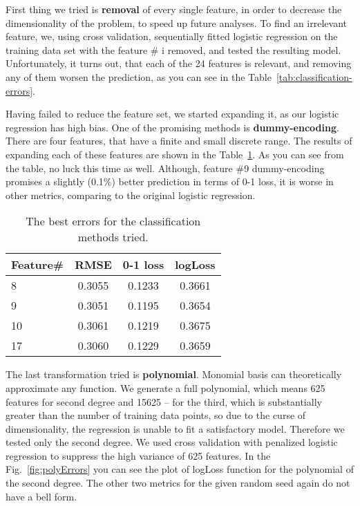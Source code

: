 \documentclass{article} %
\begin{document}
First thing we tried is {\bf removal} of every single feature, in order to decrease the dimensionality of the problem, to speed up future analyses. To find an irrelevant feature, we, using cross validation, sequentially fitted logistic regression on the training data set with the feature \# i removed, and tested the resulting model. Unfortunately, it turns out, that each of the 24 features is relevant, and removing any of them worsen the prediction, as you can see in the Table~\ref{tab:classification-errors}.

Having failed to reduce the feature set, we started expanding it, as our logistic regression has high bias. One of the promising methods is {\bf dummy-encoding}. There are four features, that have a finite and small discrete range. The results of expanding each of these features are shown in the Table~\ref{tab:classification-dummy}. As you can see from the table, no luck this time as well. Although, feature \#9 dummy-encoding promises a slightly (0.1\%) better prediction in terms of 0-1 loss, it is worse in other metrics, comparing to the original logistic regression.
\begin{table}[h]
  \begin{center}
    \begin{tabular}{l|ccc}
      Feature\# & RMSE & 0-1 loss & logLoss \\
      \hline
      8 & 0.3055 & 0.1233 & 0.3661 \\
      9 & 0.3051 & 0.1195 & 0.3654 \\
      10 & 0.3061 & 0.1219 & 0.3675 \\
      17 & 0.3060 & 0.1229 & 0.3659
    \end{tabular}
    \caption{The best errors for the classification methods tried.}
    \label{tab:classification-dummy}
  \end{center}
\end{table}

The last transformation tried is {\bf polynomial}. Monomial basis can theoretically approximate any function. We generate a full polynomial, which means 625 features for second degree and 15625 -- for the third, which is substantially greater than the number of training data points, so due to the curse of dimensionality, the regression is unable to fit a satisfactory model. Therefore we tested only the second degree. We used cross validation with penalized logistic regression to suppress the high variance of 625 features. In the Fig.~\ref{fig:polyErrors} you can see the plot of logLoss function for the polynomial of the second degree. The other two metrics for the given random seed again do not have a bell form.
\end{document}
